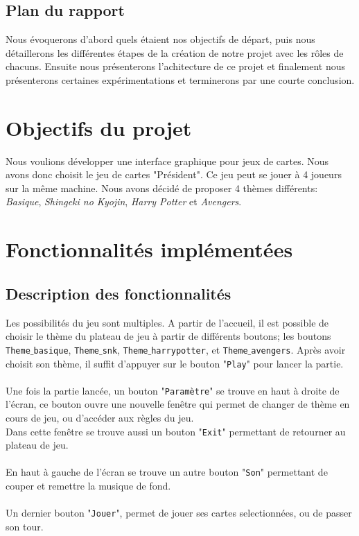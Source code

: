 \documentclass[french,12pt]{article}
\begin{document}
\subsection{Plan du rapport}

Nous évoquerons d'abord quels étaient nos objectifs de départ, puis nous détaillerons les différentes étapes de la création de notre projet avec les rôles de chacuns. Ensuite nous présenterons l'achitecture de ce projet et finalement nous présenterons certaines expérimentations et terminerons par une courte conclusion.

\section{Objectifs du projet}

Nous voulions développer une interface graphique pour jeux de cartes. Nous avons donc choisit le jeu de cartes "Président". Ce jeu peut se jouer à 4 joueurs sur la même machine. Nous avons décidé de proposer 4 thèmes différents: \textit{Basique}, \textit{Shingeki no Kyojin}, \textit{Harry Potter} et \textit{Avengers}.

\section{Fonctionnalités implémentées}

\subsection{Description des fonctionnalités}

Les possibilités du jeu sont multiples. A partir de l'accueil, il est possible de choisir le thème du plateau de jeu à partir de différents boutons; les boutons \texttt{Theme$\_$basique}, \texttt{Theme$\_$snk}, \texttt{Theme$\_$harrypotter}, et \texttt{Theme$\_$avengers}. Après avoir choisit son thème, il suffit d'appuyer sur le bouton "\texttt{Play}" pour lancer la partie.
\\\\
Une fois la partie lancée, un bouton "\texttt{Paramètre}" se trouve en haut à droite de l'écran, ce bouton ouvre une nouvelle fenêtre qui permet de changer de thème en cours de jeu, ou d'accéder aux règles du jeu.\\
Dans cette fenêtre se trouve aussi un bouton "\texttt{Exit}" permettant de retourner au plateau de jeu.
\\\\
En haut à gauche de l'écran se trouve un autre bouton "\texttt{Son}" permettant de couper et remettre la musique de fond.
\\\\
Un dernier bouton "\texttt{Jouer}", permet de jouer ses cartes selectionnées, ou de passer son tour.
\end{document}
